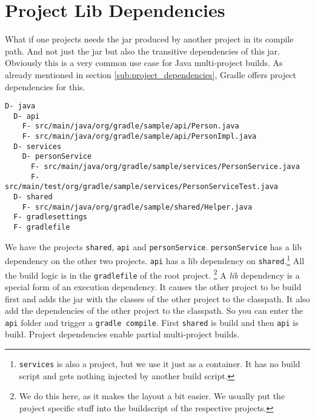 \section{Project Lib Dependencies} %
\label{sec:project_jar_dependencies}
What if one projects needs the jar produced by another project in its compile path. And not just the jar but also the transitive dependencies of this jar. Obviously this is a very common use case for Java multi-project builds. As already mentioned in section \ref{sub:project_dependencies}, Gradle offers project dependencies for this.
\begin{Verbatim}[frame=single,label=Project Tree]
D- java
  D- api
    F- src/main/java/org/gradle/sample/api/Person.java
    F- src/main/java/org/gradle/sample/api/PersonImpl.java
  D- services
    D- personService
      F- src/main/java/org/gradle/sample/services/PersonService.java
      F- src/main/test/org/gradle/sample/services/PersonServiceTest.java
  D- shared 
    F- src/main/java/org/gradle/sample/shared/Helper.java 
  F- gradlesettings
  F- gradlefile
\end{Verbatim}
We have the projects \texttt{shared}, \texttt{api} and \texttt{personService}. \texttt{personService} has a lib dependency on the other two projects. \texttt{api} has a lib dependency on \texttt{shared}.\footnote{\texttt{services} is also a project, but we use it just as a container. It has no build script and gets nothing injected by another build script.}
All the build logic is in the \texttt{gradlefile} of the root project.
\footnote{We do this here, as it makes the layout a bit easier. We usually put the project specific stuff into the buildscript of the respective projects.} 
A \emph{lib} dependency is a special form of an execution dependency. It causes the other project to be build first and adds the jar with the classes of the other project to the classpath. It also add the dependencies of the other project to the classpath. So you can enter the \texttt{api} folder and trigger a \texttt{gradle compile}. First \texttt{shared} is build and then \texttt{api} is build. Project dependencies enable partial multi-project builds.

